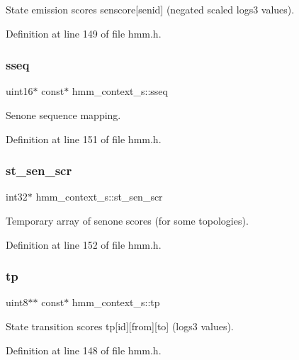 State emission scores senscore[senid] (negated scaled logs3 values). 



Definition at line 149 of file hmm.\+h.

\mbox{\label{structhmm__context__s_abbb0a32aadcc1938d9f21b04204c52da}} 
\subsubsection{sseq}
{\footnotesize\ttfamily uint16$\ast$ const$\ast$ hmm\+\_\+context\+\_\+s\+::sseq}



Senone sequence mapping. 



Definition at line 151 of file hmm.\+h.

\mbox{\label{structhmm__context__s_a671c02e0443f41914471a7acfac6125c}} 
\subsubsection{st\+\_\+sen\+\_\+scr}
{\footnotesize\ttfamily int32$\ast$ hmm\+\_\+context\+\_\+s\+::st\+\_\+sen\+\_\+scr}



Temporary array of senone scores (for some topologies). 



Definition at line 152 of file hmm.\+h.

\mbox{\label{structhmm__context__s_a9ef2d83f67525050bea8b05f8a118f44}} 
\subsubsection{tp}
{\footnotesize\ttfamily uint8$\ast$$\ast$ const$\ast$ hmm\+\_\+context\+\_\+s\+::tp}



State transition scores tp[id][from][to] (logs3 values). 



Definition at line 148 of file hmm.\+h.

